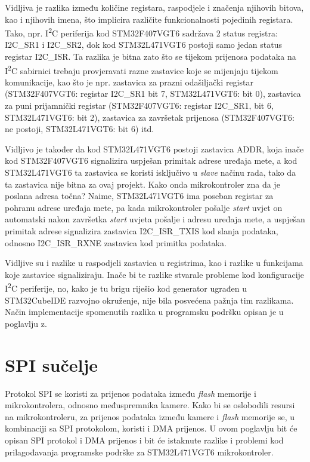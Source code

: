 Vidljiva je razlika između količine registara, raspodjele i značenja njihovih bitova, kao i njihovih imena, što implicira različite funkcionalnosti pojedinih registara. Tako, npr. I\textsuperscript{2}C periferija kod STM32F407VGT6 sadržava 2 status registra: I2C\_SR1 i I2C\_SR2, dok kod STM32L471VGT6 postoji samo jedan status registar I2C\_ISR. Ta razlika je bitna zato što se tijekom prijenosa podataka na I\textsuperscript{2}C sabirnici trebaju provjeravati razne zastavice koje se mijenjaju tijekom komunikacije, kao što je npr. zastavica za prazni odašiljački registar (STM32F407VGT6: registar I2C\_SR1 bit 7, STM32L471VGT6: bit 0), zastavica za puni prijamnički registar (STM32F407VGT6: registar I2C\_SR1, bit 6, STM32L471VGT6: bit 2), zastavica za završetak prijenosa (STM32F407VGT6: ne postoji, STM32L471VGT6: bit 6) itd.

Vidljivo je također da kod STM32L471VGT6 postoji zastavica ADDR, koja inače kod STM32F407VGT6 signalizira uspješan primitak adrese uređaja mete, a kod \newline STM32L471VGT6 ta zastavica se koristi isključivo u \textit{slave} načinu rada, tako da ta zastavica nije bitna za ovaj projekt. Kako onda mikrokontroler zna da je poslana adresa točna? Naime, STM32L471VGT6 ima poseban registar za pohranu adrese uređaja mete, pa kada mikrokontroler pošalje \textit{start} uvjet on automatski nakon završetka \textit{start} uvjeta pošalje i adresu uređaja mete, a uspješan primitak adrese signalizira zastavica I2C\_ISR\_TXIS kod slanja podataka, odnosno I2C\_ISR\_RXNE zastavica kod primitka podataka.

Vidljive su i razlike u raspodjeli zastavica u registrima, kao i razlike u funkcijama koje zastavice signaliziraju. Inače bi te razlike stvarale probleme kod konfiguracije I\textsuperscript{2}C periferije, no, kako je tu brigu riješio kod generator ugrađen u STM32CubeIDE razvojno okruženje, nije bila posvećena pažnja tim razlikama. Način implementacije spomenutih razlika u programsku podršku opisan je u poglavlju z.

\section{SPI sučelje}

Protokol SPI se koristi za prijenos podataka između \textit{flash} memorije i mikrokontrolera, odnosno međuspremnika kamere. Kako bi se oslobodili resursi na mikrokontroleru, za prijenos podataka između kamere i \textit{flash} memorije se, u kombinaciji sa SPI protokolom, koristi i DMA prijenos. U ovom poglavlju bit će opisan SPI protokol i DMA prijenos i bit će istaknute razlike i problemi kod prilagođavanja programske podrške za STM32L471VGT6 mikrokontroler.

